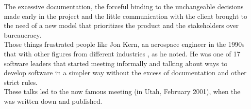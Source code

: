 	The excessive documentation, the forceful binding to the unchangeable decisions made early in the project and the little communication with the client brought to the need of a new model that prioritizes the product and the stakeholders over bureaucracy.\\
	Those things frustrated people like Jon Kern, an aerospace engineer in the 1990s that with other figures from different industries , as he noted.
	He was one of 17 software leaders that started meeting informally and talking about ways to develop software in a simpler way without the excess of documentation and other strict rules.\\
	These talks led to the now famous  meeting (in Utah, February 2001), when the  was written down and published.

